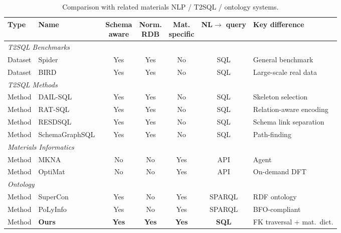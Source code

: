 \documentclass{npj-compt.mater}
\begin{document}
\begin{table}[htbp]
  \centering
  \caption{Comparison with related materials NLP / T2SQL / ontology systems.}
  \label{tab:related_comparison}
  \small
  \begin{tabularx}{\textwidth}{llccccX}
    \toprule
    Type & Name & \shortstack{Schema\\aware} & \shortstack{Norm.\\RDB} & \shortstack{Mat.\\specific} & \shortstack{NL$\to$\\query} & Key difference \\
    \midrule
    \multicolumn{7}{l}{\textit{T2SQL Benchmarks}} \\
    Dataset & Spider~\cite{yu2018spider} & Yes & Yes & No & SQL & General benchmark \\
    Dataset & BIRD~\cite{li2024bird} & Yes & Yes & No & SQL & Large-scale real data \\
    \midrule
    \multicolumn{7}{l}{\textit{T2SQL Methods}} \\
    Method & DAIL-SQL~\cite{gao2023dail} & Yes & Yes & No & SQL & Skeleton selection \\
    Method & RAT-SQL~\cite{wang2020ratsql} & Yes & Yes & No & SQL & Relation-aware encoding \\
    Method & RESDSQL~\cite{li2023resdsql} & Yes & Yes & No & SQL & Schema link separation \\
    Method & SchemaGraphSQL~\cite{safdarian2026schemagraphsql} & Yes & Yes & No & SQL & Path-finding \\
    \midrule
    \multicolumn{7}{l}{\textit{Materials Informatics}} \\
    Method & MKNA~\cite{zhuang2026mkna} & No & No & Yes & API & Agent \\
    Method & OptiMat~\cite{hu2026optimat} & No & No & Yes & API & On-demand DFT \\
    \midrule
    \multicolumn{7}{l}{\textit{Ontology}} \\
    Method & SuperCon~\cite{ishii2023supercon} & Yes & No & Yes & SPARQL & RDF ontology \\
    Method & PoLyInfo~\cite{ishii2024polyinfo} & Yes & No & Yes & SPARQL & BFO-compliant \\
    \midrule
    Method & \textbf{Ours} & \textbf{Yes} & \textbf{Yes} & \textbf{Yes} & \textbf{SQL} & FK traversal + mat.\ dict. \\
    \bottomrule
  \end{tabularx}
\end{table}
\end{document}
